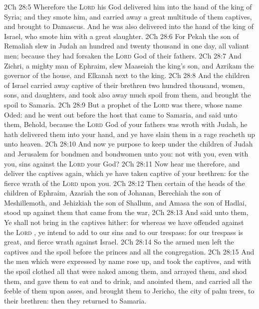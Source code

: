 \vs 2Ch 28:5 Wherefore the \textsc{Lord} his God delivered him into the hand of the king of Syria; and they smote him, and carried away a great multitude of them captives, and brought  to Damascus. And he was also delivered into the hand of the king of Israel, who smote him with a great slaughter.
\vs 2Ch 28:6 For Pekah the son of Remaliah slew in Judah an hundred and twenty thousand in one day,  all valiant men; because they had forsaken the \textsc{Lord} God of their fathers.
\vs 2Ch 28:7 And Zichri, a mighty man of Ephraim, slew Maaseiah the king's son, and Azrikam the governor of the house, and Elkanah  next to the king.
\vs 2Ch 28:8 And the children of Israel carried away captive of their brethren two hundred thousand, women, sons, and daughters, and took also away much spoil from them, and brought the spoil to Samaria.
\vs 2Ch 28:9 But a prophet of the \textsc{Lord} was there, whose name  Oded: and he went out before the host that came to Samaria, and said unto them, Behold, because the \textsc{Lord} God of your fathers was wroth with Judah, he hath delivered them into your hand, and ye have slain them in a rage  reacheth up unto heaven.
\vs 2Ch 28:10 And now ye purpose to keep under the children of Judah and Jerusalem for bondmen and bondwomen unto you:  not with you, even with you, sins against the \textsc{Lord} your God?
\vs 2Ch 28:11 Now hear me therefore, and deliver the captives again, which ye have taken captive of your brethren: for the fierce wrath of the \textsc{Lord}  upon you.
\vs 2Ch 28:12 Then certain of the heads of the children of Ephraim, Azariah the son of Johanan, Berechiah the son of Meshillemoth, and Jehizkiah the son of Shallum, and Amasa the son of Hadlai, stood up against them that came from the war,
\vs 2Ch 28:13 And said unto them, Ye shall not bring in the captives hither: for whereas we have offended against the \textsc{Lord} , ye intend to add  to our sins and to our trespass: for our trespass is great, and  fierce wrath against Israel.
\vs 2Ch 28:14 So the armed men left the captives and the spoil before the princes and all the congregation.
\vs 2Ch 28:15 And the men which were expressed by name rose up, and took the captives, and with the spoil clothed all that were naked among them, and arrayed them, and shod them, and gave them to eat and to drink, and anointed them, and carried all the feeble of them upon asses, and brought them to Jericho, the city of palm trees, to their brethren: then they returned to Samaria.
